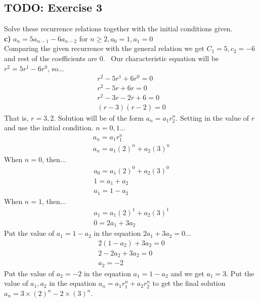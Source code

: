 \documentclass[12pt]{article}
\begin{document}
    \subsection{TODO: Exercise 3}
    Solve these recurrence relations together with the initial conditions given.\\
    \textbf{c)} $ a_n=5a_{n-1} - 6a_{n-2} $ for $ n \geq 2, a_0=1, a_1=0 $\\
    Comparing the given recurrence with the general relation we get $C_1=5,c_2=-6$ and rest of the coefficients are $0$.
    ~Our characteristic equation will be $r^2=5r^1-6r^0$, so...
    \begin{equation}
        \begin{split}
            r^2-5r^1+6r^0=0\\
            r^2-5r+6r=0\\
            r^2-3r-2r+6=0\\
            (r-3)(r-2)=0
        \end{split}
    \end{equation}
    That is, $r=3,2$.
    Solution will be of the form $a_n=a_1r_2^n$. Setting in the value of $r$ and use the initial condition.
    $n=0,1$...\\
    \begin{equation}
        \begin{split}
            a_n=a_1r_1^n\\
            a_n=a_1(2)^n+a_2(3)^n
        \end{split}
    \end{equation}
    When $n=0$, then...
    \begin{equation}
        \begin{split}
            a_0=a_1(2)^0+a_2(3)^0\\
            1=a_1+a_2\\
            a_1=1-a_2
        \end{split}
    \end{equation}
    When $n=1$, then...
    \begin{equation}
        \begin{split}
            a_1=a_1(2)^1+a_2(3)^1\\
            0=2a_1+3a_2
        \end{split}
    \end{equation}
    Put the value of $a_1=1-a_2$ in the equation $2a_1+3a_2=0$...
    \begin{equation}
        \begin{split}
            2(1-a_2)+3a_2=0\\
            2-2a_2+3a_2=0\\
            a_2=-2
        \end{split}
    \end{equation}
    Put the value of $a_2=-2$ in the equation $a_1=1-a_2$ and we get $a_1=3$.
    Put the value of $a_1,a_2$ in the equation $a_n=a_1r_1^n+a_2r_2^n$ to get the final solution $a_n=3 \times (2)^n-2 \times (3)^n$.
\end{document}
